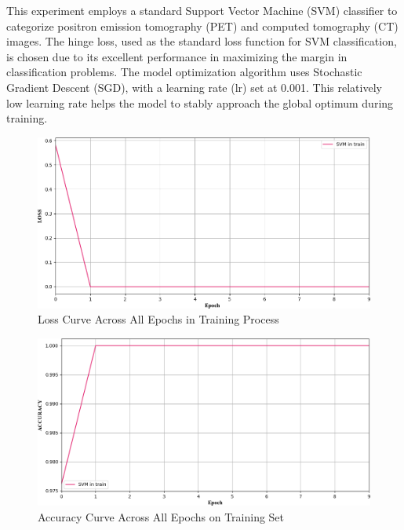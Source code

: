 \documentclass[twocolumn]{article}
\begin{document}
This experiment employs a standard Support Vector Machine (SVM) classifier to categorize positron emission tomography (PET) and computed tomography (CT) images. The hinge loss, used as the standard loss function for SVM classification, is chosen due to its excellent performance in maximizing the margin in classification problems. The model optimization algorithm uses Stochastic Gradient Descent (SGD), with a learning rate (lr) set at 0.001. This relatively low learning rate helps the model to stably approach the global optimum during training.

\begin{figure}[h]
	\centering
	\includegraphics[width=1.0\linewidth]{exp_log/train440_valid024/LOSS_train}
	\caption{Loss Curve Across All Epochs in Training Process}
	\label{fig:loss_train}
\end{figure}

\begin{figure}[h]
	\centering
	\includegraphics[width=1.0\linewidth]{exp_log/train440_valid024/ACCURACY_train}
	\caption{Accuracy Curve Across All Epochs on Training Set}
	\label{fig:acc_train}
\end{figure}
\end{document}
